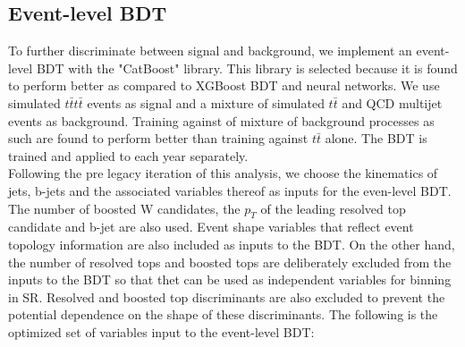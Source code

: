 \documentclass[twoside]{article}
\begin{document}
\subsection{Event-level BDT}
To further discriminate between signal and background, we implement an event-level BDT with the "CatBoost" library. This library is selected because it is found to perform better as compared to XGBoost BDT and neural networks. We use simulated $t\bar{t}t\bar{t}$ events as signal and a mixture of simulated $t\bar{t}$ and QCD multijet events as background. Training against of mixture of background processes as such are found to perform better than training against $t\bar{t}$ alone. The BDT is trained and applied to each year separately.
\\
Following the pre legacy iteration of this analysis, we choose the kinematics of jets, b-jets and the associated variables thereof as inputs for the even-level BDT. The number of boosted W candidates, the $p_T$ of the leading resolved top candidate and b-jet are also used. Event shape variables that reflect event topology information are also included as inputs to the BDT. On the other hand, the number of resolved tops and boosted tops are deliberately excluded from the inputs to the BDT so that thet can be used as independent variables for binning in SR. Resolved and boosted top discriminants are also excluded to prevent the potential dependence on the shape of these discriminants. The following is the optimized set of variables input to the event-level BDT:
\\
\end{document}
